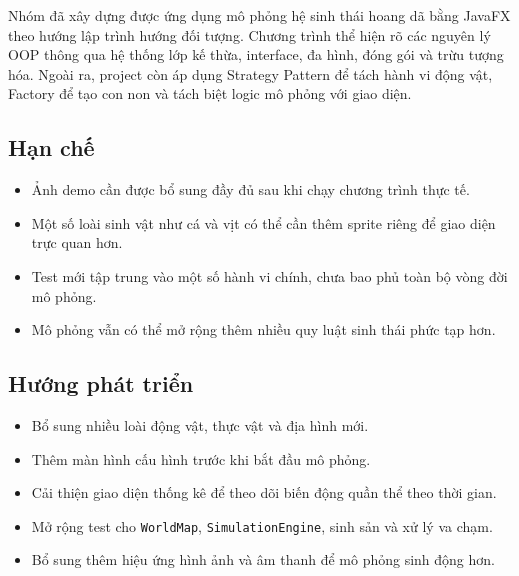 \documentclass[12pt,a4paper]{article}
\begin{document}
Nhóm đã xây dựng được ứng dụng mô phỏng hệ sinh thái hoang dã bằng JavaFX theo hướng lập trình hướng đối tượng. Chương trình thể hiện rõ các nguyên lý OOP thông qua hệ thống lớp kế thừa, interface, đa hình, đóng gói và trừu tượng hóa. Ngoài ra, project còn áp dụng Strategy Pattern để tách hành vi động vật, Factory để tạo con non và tách biệt logic mô phỏng với giao diện.

\subsection{Hạn chế}

\begin{itemize}
    \item Ảnh demo cần được bổ sung đầy đủ sau khi chạy chương trình thực tế.
    \item Một số loài sinh vật như cá và vịt có thể cần thêm sprite riêng để giao diện trực quan hơn.
    \item Test mới tập trung vào một số hành vi chính, chưa bao phủ toàn bộ vòng đời mô phỏng.
    \item Mô phỏng vẫn có thể mở rộng thêm nhiều quy luật sinh thái phức tạp hơn.
\end{itemize}

\subsection{Hướng phát triển}

\begin{itemize}
    \item Bổ sung nhiều loài động vật, thực vật và địa hình mới.
    \item Thêm màn hình cấu hình trước khi bắt đầu mô phỏng.
    \item Cải thiện giao diện thống kê để theo dõi biến động quần thể theo thời gian.
    \item Mở rộng test cho \texttt{WorldMap}, \texttt{SimulationEngine}, sinh sản và xử lý va chạm.
    \item Bổ sung thêm hiệu ứng hình ảnh và âm thanh để mô phỏng sinh động hơn.
\end{itemize}
\end{document}
